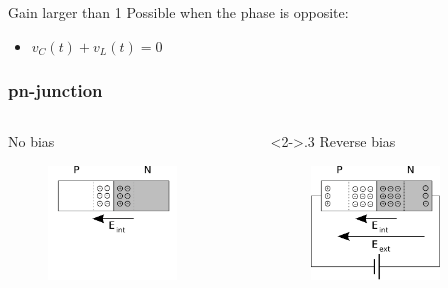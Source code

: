 \documentclass[beamer]{standalone}
\begin{document}
\begin{frame}
\begin{columns}
\begin{column}{0.5\textwidth}
  \end{column}
 \end{columns}
 \begin{block}{Gain larger than 1}
  Possible when the phase is opposite:
  \begin{itemize}
   \item $v_C(t) + v_L(t) = 0$
  \end{itemize}
 \end{block}
\end{frame}

\begin{frame}
\frametitle{pn-junction}
 \begin{columns}[t]
  \begin{column}{.3\textwidth}
    No bias
    \begin{figure}
      \includegraphics[width=0.80\textwidth]{./pics/pnjunction_nobias}
    \end{figure}
  \end{column}
  \begin{column}<2->{.3\textwidth}
    Reverse bias
    \begin{figure}
      \includegraphics[width=0.80\textwidth]{./pics/pnjunction_reverse_bias}

\end{figure}
\end{column}
\end{columns}
\end{frame}
\end{document}
